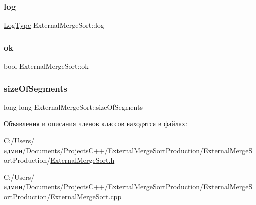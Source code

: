\hypertarget{class_external_merge_sort_a41f61c3beb7dc529d7f2a8b2b4ee380b}{}\label{class_external_merge_sort_a41f61c3beb7dc529d7f2a8b2b4ee380b} 
\subsubsection{\texorpdfstring{log}{log}}
{\footnotesize\ttfamily \hyperlink{_structures_8h_af67907baa897e9fb84df0cb89795b87c}{Log\+Type} External\+Merge\+Sort\+::log\hspace{0.3cm}{\ttfamily [private]}}

\hypertarget{class_external_merge_sort_a4b050cd230e144a11f65e57523e15ce6}{}\label{class_external_merge_sort_a4b050cd230e144a11f65e57523e15ce6} 
\subsubsection{\texorpdfstring{ok}{ok}}
{\footnotesize\ttfamily bool External\+Merge\+Sort\+::ok\hspace{0.3cm}{\ttfamily [private]}}

\hypertarget{class_external_merge_sort_a1d68bb5e0373cf16807a41272dff1a99}{}\label{class_external_merge_sort_a1d68bb5e0373cf16807a41272dff1a99} 
\subsubsection{\texorpdfstring{size\+Of\+Segments}{sizeOfSegments}}
{\footnotesize\ttfamily long long External\+Merge\+Sort\+::size\+Of\+Segments\hspace{0.3cm}{\ttfamily [private]}}



Объявления и описания членов классов находятся в файлах\+:\begin{DoxyCompactItemize}
\item 
C\+:/\+Users/админ/\+Documents/\+Projects\+C++/\+External\+Merge\+Sort\+Production/\+External\+Merge\+Sort\+Production/\hyperlink{_external_merge_sort_8h}{External\+Merge\+Sort.\+h}\item 
C\+:/\+Users/админ/\+Documents/\+Projects\+C++/\+External\+Merge\+Sort\+Production/\+External\+Merge\+Sort\+Production/\hyperlink{_external_merge_sort_8cpp}{External\+Merge\+Sort.\+cpp}\end{DoxyCompactItemize}
